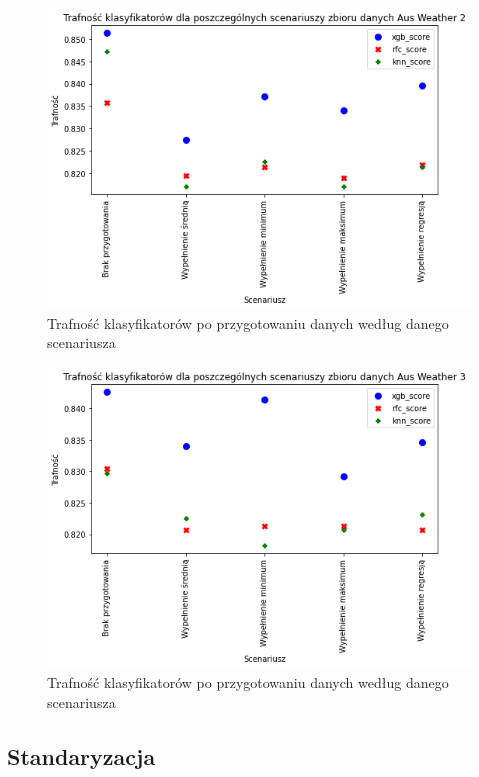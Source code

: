 \documentclass{book}
\begin{document}
\begin{figure}[H]
\centerline{\includegraphics{Aus_Weather_2_Wypełnienie_brakujących}}
\centering
\caption{Trafność klasyfikatorów po przygotowaniu danych 
według danego scenariusza}
\end{figure}

\begin{figure}[H]
\centerline{\includegraphics{Aus_Weather_3_Wypełnienie_brakujących}}
\centering
\caption{Trafność klasyfikatorów po przygotowaniu danych 
według danego scenariusza}
\end{figure}

\subsection{Standaryzacja}
\end{document}

